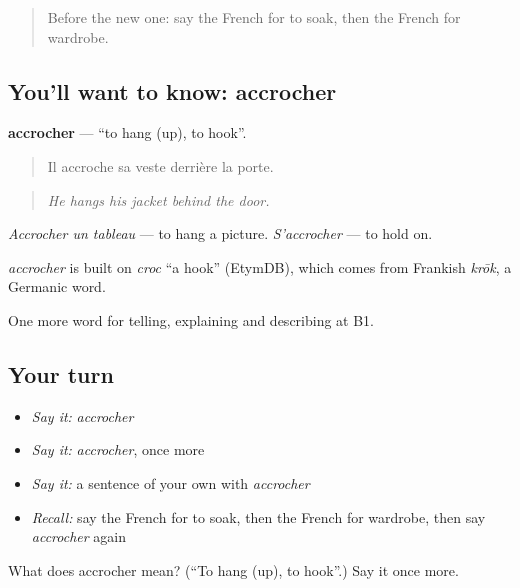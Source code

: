\label{lesson:FR-C527-accrocher}



\begin{quote}
Before the new one: say the French for to soak, then the French for wardrobe.
\end{quote}

\subsection*{You'll want to know: accrocher}
\textbf{accrocher} — \textquotedblleft{}to hang (up), to hook\textquotedblright{}.

\begin{quote}
Il accroche sa veste derrière la porte.
\end{quote}

\begin{quote}
\emph{He hangs his jacket behind the door.}
\end{quote}

\emph{Accrocher un tableau} — to hang a picture. \emph{S'accrocher} — to hold on.

\begin{cousinweb}
\emph{accrocher} is built on \emph{croc} \textquotedblleft{}a hook\textquotedblright{} (EtymDB), which comes from Frankish \emph{krōk}, a Germanic word.
\end{cousinweb}

\begin{grammarlens}[title={What you've built}]
One more word for telling, explaining and describing at B1.
\end{grammarlens}

\subsection*{Your turn}
\begin{itemize}
\raggedright
  \item \emph{Say it:} \emph{accrocher}
  \item \emph{Say it:} \emph{accrocher}, once more
  \item \emph{Say it:} a sentence of your own with \emph{accrocher}
  \item \emph{Recall:} say the French for to soak, then the French for wardrobe, then say \emph{accrocher} again
\end{itemize}

\begin{tcolorbox}[breakable,colback=teal!4,colframe=teal!35!black,title={Before you move on}]
What does accrocher mean? (\textquotedblleft{}To hang (up), to hook\textquotedblright{}.) Say it once more.
\end{tcolorbox}
